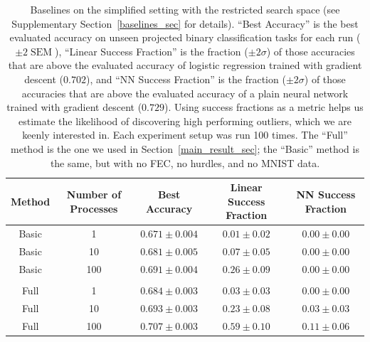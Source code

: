 {\begin{table}[!ht]
\caption{Baselines on the simplified setting with the restricted search space (see Supplementary Section~\ref{baselines_sec} for details). ``Best Accuracy'' is the best evaluated accuracy on unseen projected binary classification tasks for each run ($\pm 2\operatorname{SEM}$), ``Linear Success Fraction'' is the fraction ($\pm 2\sigma$) of those accuracies that are above the evaluated accuracy of logistic regression trained with gradient descent ($0.702$), and ``NN Success Fraction'' is the fraction ($\pm 2\sigma$) of those accuracies that are above the evaluated accuracy of a plain neural network trained with gradient descent ($0.729$). Using success fractions as a metric  helps us estimate the likelihood of discovering high performing outliers, which we are keenly interested in. Each experiment setup was run 100 times. The ``Full'' method is the one we used in Section~\ref{main_result_sec}; the ``Basic'' method is the same, but with no FEC, no hurdles, and no MNIST data.}
\label{external_baselines_table}
\begin{center}
\begin{small}
\begin{sc}
\begin{tabular}{ccccc}
\toprule
Method & Number of Processes & Best Accuracy & Linear Success Fraction & NN Success Fraction \\
\midrule
Basic & 1 & $0.671 \pm 0.004$ &  $0.01 \pm 0.02$ &  $0.00 \pm 0.00$ \\
Basic & 10 & $0.681 \pm 0.005$  &  $0.07 \pm 0.05$ &  $0.00 \pm 0.00$ \\
Basic & 100 & $0.691 \pm 0.004$  & $0.26 \pm 0.09$ & $0.00 \pm 0.00$ \\
\\
Full & 1 & $0.684 \pm 0.003$ &  $0.03 \pm 0.03$ &  $0.00 \pm 0.00$ \\
Full & 10 & $0.693 \pm 0.003$ &  $0.23 \pm 0.08$ &  $0.03 \pm 0.03$ \\
Full & 100 & $0.707 \pm 0.003$ & $0.59 \pm 0.10$ & $0.11 \pm 0.06$ \\
\bottomrule
\end{tabular}
\end{sc}
\end{small}
\end{center}
\end{table}

}  %
